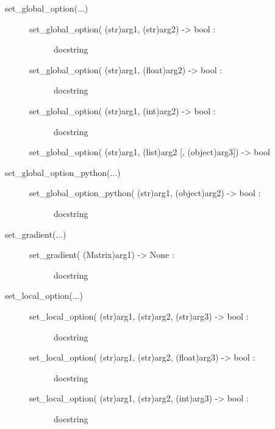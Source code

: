 \documentclass[letterpaper,10pt,english]{sphinxmanual}
\begin{document}
\begin{description}
\begin{description}
\begin{description}
\end{description}

\item[{set\_global\_option(...)}] \leavevmode\begin{description}
\item[{set\_global\_option( (str)arg1, (str)arg2) -\textgreater{} bool :}] \leavevmode
docstring

\item[{set\_global\_option( (str)arg1, (float)arg2) -\textgreater{} bool :}] \leavevmode
docstring

\item[{set\_global\_option( (str)arg1, (int)arg2) -\textgreater{} bool :}] \leavevmode
docstring

\end{description}

set\_global\_option( (str)arg1, (list)arg2 {[}, (object)arg3{]}) -\textgreater{} bool

\item[{set\_global\_option\_python(...)}] \leavevmode\begin{description}
\item[{set\_global\_option\_python( (str)arg1, (object)arg2) -\textgreater{} bool :}] \leavevmode
docstring

\end{description}

\item[{set\_gradient(...)}] \leavevmode\begin{description}
\item[{set\_gradient( (Matrix)arg1) -\textgreater{} None :}] \leavevmode
docstring

\end{description}

\item[{set\_local\_option(...)}] \leavevmode\begin{description}
\item[{set\_local\_option( (str)arg1, (str)arg2, (str)arg3) -\textgreater{} bool :}] \leavevmode
docstring

\item[{set\_local\_option( (str)arg1, (str)arg2, (float)arg3) -\textgreater{} bool :}] \leavevmode
docstring

\item[{set\_local\_option( (str)arg1, (str)arg2, (int)arg3) -\textgreater{} bool :}] \leavevmode
docstring

\end{description}


\end{description}
\end{description}
\end{document}

